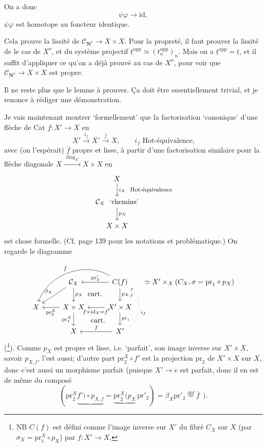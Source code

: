 \documentclass[11pt]{article}
\newcommand{\printedpage}[1]{\marginpar{\footnotesize p.~#1}}
\newcommand{\msp}[1]{\marginpar{\footnotesize [#1]}}
\newcommand{\CN}{\mathcal{C}_{\mathbf{N}^o}}
\begin{document}
On a donc
\[ \psi\varphi \longrightarrow \mathrm{id}, \]
$\psi\varphi$ est homotope au foncteur identique.

Cela prouve la lissité de $\CN \longrightarrow X \times X$. Pour la propreté, il faut prouver la lissité de le cas de $X^o$, et du système projectif $\underline{t}^{\mathrm{opp}} \simeq (t_n^{\mathrm{opp}})_n$. Mais on a $\underline{t}^{\mathrm{opp}} = \underline{t}$, et il suffit d'appliquer ce qu'on a déjà prouvé au cas de $X^o$, pour voir que $\CN \longrightarrow X \times X$ est propre. %

Il ne reste plus que le lemme à prouver. Ça doit être essentiellement
\msp{page 170}
trivial, et je renonce à rédiger une démonstration.

Je vais maintenant montrer `formellement' que la factorisation `canonique' d'une flèche de Cat $f : X' \longrightarrow X$ en
\[ X' \xrightarrow{i_f} \overline{X'} \xrightarrow{\bar{f}} X, \qquad i_f \text{ Hot-équivalence,} \]
avec (on l'espérait) $\bar{f}$ propre et lisse, à partir d'une factorisation similaire pour la flèche diagonale $X \xrightarrow{\ \ \mathrm{diag}_X\ \ } X \times X$ en
\[
\begin{tikzcd}
X \arrow[d, "i_X\ \ \text{\footnotesize Hot-équivalence}"] \\
\mathcal{C}_X\ \ \text{`chemins'} \arrow[d, "p_X"] \\
X \times X
\end{tikzcd}
\]
est chose formelle. (Cf. page 139 pour les notations et problématique.) On regarde le diagramme
\[
\begin{tikzcd}
 & \mathcal{C}_X \arrow[d, "p_X"] \arrow[dl, "\beta_X"'] \arrow[dr, phantom, "\text{cart.}"] & C(f) \arrow[l, "\mathrm{pr}'_2"'] \arrow[d, "p_{X,f}"] \arrow[dll, bend right=50, "\bar{f}"'] & [-1.5em] \simeq X' \times_X (C_X, \sigma = \mathrm{pr}_1 \circ p_X) \\ %
X & X \times X \arrow[l, "\mathrm{pr}_2^X"] \arrow[d, "\mathrm{pr}_1^X"'] \arrow[dr, phantom, "\text{cart.}"] & X' \times X \arrow[l, "f \times \mathrm{id}_X = f'"] \arrow[d, "\mathrm{pr}_1"] & \\
 & X & X' \arrow[l, "f"'] \arrow[uu, bend right=60, dotted, "i_f"'] &
\end{tikzcd}
\]
\printedpage{107}
(\footnote[40]{NB $C(f)$ est défini comme l'image inverse sur $X'$ du fibré $C_X$ sur $X$ (par $\sigma_X = \mathrm{pr}_1^X \circ p_X$) par $f : X' \longrightarrow X$.}). Comme $p_X$ est propre et lisse, i.e. `parfait', son image inverse sur $X' \times X$, savoir $p_{X,f}$, l'est aussi; d'autre part $\mathrm{pr}_2^X \circ f'$ est la
\msp{page 171}
projection $\mathrm{pr}_2$ de $X' \times X$ sur $X$, donc c'est aussi un morphisme parfait (puisque $X' \longrightarrow e$ est parfait, donc il en est de même du composé
\[ (\mathrm{pr}_2^X \underbrace{f') \circ p_{X,f}} = \underbrace{\mathrm{pr}_2^X(p_X}\, \mathrm{pr}'_2) = \beta_X \mathrm{pr}'_2 \overset{\text{déf}}{=} \bar{f} \ \ ). \]
\end{document}
